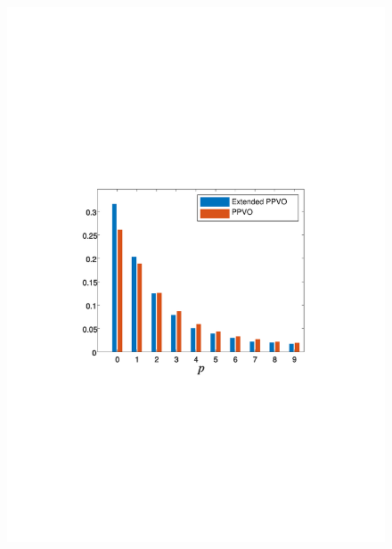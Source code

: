 \documentclass[review,3p,10pt,sort&compress]{elsarticle}
\begin{document}
\begin{figure}
{\begin{minipage}[t]{0.227\linewidth}
    \includegraphics[width=1\textwidth]{figures/Comparison/barbara.pdf}
    \end{minipage}
}



\end{figure}
\end{document}
